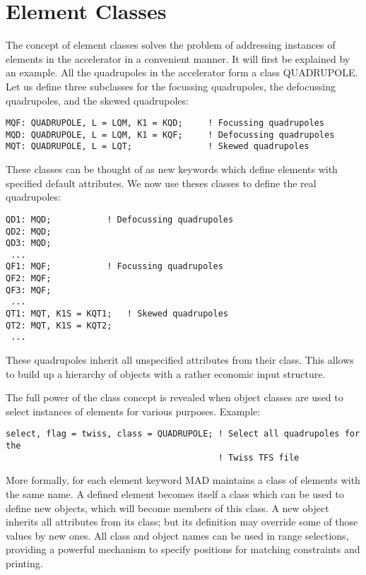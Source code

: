 
\section{Element Classes}  
The concept of element classes solves the problem of addressing
instances of elements in the accelerator in a convenient manner. It will
first be explained by an example. All the quadrupoles in the accelerator
form a class QUADRUPOLE. Let us define three subclasses for the
focussing quadrupoles, the defocussing quadrupoles, and the skewed
quadrupoles:  
\begin{verbatim}
MQF: QUADRUPOLE, L = LQM, K1 = KQD;     ! Focussing quadrupoles
MQD: QUADRUPOLE, L = LQM, K1 = KQF;     ! Defocussing quadrupoles
MQT: QUADRUPOLE, L = LQT;               ! Skewed quadrupoles
\end{verbatim} 

These classes can be thought of as new keywords which define elements
with specified default attributes. We now use theses classes to define
the real quadrupoles:  
\begin{verbatim}
QD1: MQD;           ! Defocussing quadrupoles
QD2: MQD;
QD3: MQD;
 ...
QF1: MQF;           ! Focussing quadrupoles
QF2: MQF;
QF3: MQF;
 ...
QT1: MQT, K1S = KQT1;   ! Skewed quadrupoles
QT2: MQT, K1S = KQT2;
 ...
\end{verbatim} 

These quadrupoles inherit all unspecified attributes from their
class. This allows to build up a hierarchy of objects with a rather
economic input structure.  

The full power of the class concept is revealed when object classes are
used to select instances of elements for various purposes. Example:  
\begin{verbatim}
select, flag = twiss, class = QUADRUPOLE; ! Select all quadrupoles for the
                                          ! Twiss TFS file
\end{verbatim}

More formally, for each element keyword MAD maintains a class of
elements with the same name. A defined element becomes itself a class
which can be used to define new objects, which will become members of
this class. A new object inherits all attributes from its class; but its
definition may override some of those values by new ones. All class and
object names can be used in range selections, providing a powerful
mechanism to specify positions for matching constraints and printing.  

